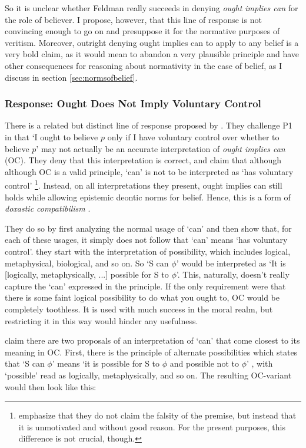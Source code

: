 \documentclass[12pt,numbers=noenddot]{scrartcl}
\begin{document}
So it is unclear whether Feldman really succeeds in denying \emph{ought implies can} for the role of believer. I propose, however, that this line of response is not convincing enough to go on and presuppose it for the normative purposes of veritism. Moreover, outright denying ought implies can to apply to any belief is a very bold claim, as it would mean to abandon a very plausible principle and have other consequences for reasoning about normativity in the case of belief, as I discuss in section \ref{sec:normsofbelief}.

\subsubsection{Response: Ought Does Not Imply Voluntary Control}\label{sec:oughtdoesnot}

There is a related but distinct line of response proposed by \textcite{Chuard2009-CHUENW}. They challenge P1 in that ‘I ought to believe $p$ only if I have voluntary control over whether to believe $p$’ may not actually be an accurate interpretation of \emph{ought implies can} (OC). They deny that this interpretation is correct, and claim that although although OC is a valid principle, ‘can’ is not to be interpreted as ‘has voluntary control’
\footnote{\textcite[601]{Chuard2009-CHUENW} emphasize that they do not claim the falsity of the premise, but instead that it is unmotivated and without good reason. For the present purposes, this difference is not crucial, though.}.
Instead, on all interpretations they present, ought implies can still holds while allowing epistemic deontic norms for belief. Hence, this is a form of \emph{doxastic compatibilism} \autocite[682]{Peels2014-PEEADC}.

They do so by first analyzing the normal usage of ‘can’ and then show that, for each of these usages, it simply does not follow that ‘can’ means ‘has voluntary control’. they start with the interpretation of possibility, which includes logical, metaphysical, biological, and so on. So ‘S can $\phi$’ would be interpreted as ‘It is [logically, metaphysically, ...] possible for S to $\phi$’. This, naturally, doesn't really capture the ‘can’ expressed in the principle. If the only requirement were that there is some faint logical possibility to do what you ought to, OC would be completely toothless. It is used with much success in the moral realm, but restricting it in this way would hinder any usefulness.

 \textcite[616]{Chuard2009-CHUENW} claim there are two proposals of an interpretation of ‘can’ that come closest to its meaning in OC. First, there is the principle of alternate possibilities which states that ‘S can $\phi$’ means ‘it is possible for S to $\phi$ and possible not to $\phi$’ \autocite[615]{Chuard2009-CHUENW}, with ‘possible’ read as logically, metaphysically, and so on. The resulting OC-variant would then look like this:
\end{document}
